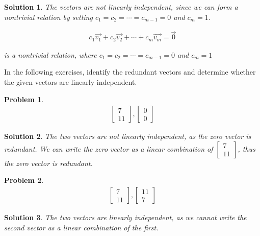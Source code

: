 \documentclass{article}
\newtheorem{problem}{Problem}
\newtheorem*{solution}{Solution}
\begin{document}
\begin{solution}
The vectors are not linearly independent, since we can form a nontrivial relation by setting $c_{1} = c_{2} = \cdots = c_{m-1} = 0$ and $c_{m} = 1$.

\begin{align*}
c_{1} \vec{v_{1}} + c_{2} \vec{v_{2}} + \cdots + c_{m} \vec{v_{m}} = \vec{0}
\end{align*}

is a nontrivial relation, where $c_{1} = c_{2} = \cdots = c_{m-1} = 0$ and $c_{m} = 1$
\end{solution}

In the following exercises, identify the redundant vectors and determine whether the given vectors are linearly independent.

\begin{problem}
\begin{align*}
\begin{bmatrix} 7 \\ 11 \end{bmatrix}, 
\begin{bmatrix} 0 \\ 0 \end{bmatrix}
\end{align*}
\end{problem}

\begin{solution}
The two vectors are not linearly independent, as the zero vector is redundant. We can write the zero vector as a linear combination of $\begin{bmatrix} 7 \\ 11 \end{bmatrix}$, thus the zero vector is redundant.
\end{solution}

\begin{problem}
\begin{align*}
\begin{bmatrix} 7 \\ 11 \end{bmatrix}, 
\begin{bmatrix} 11 \\ 7 \end{bmatrix}
\end{align*}
\end{problem}

\begin{solution}
The two vectors are linearly independent, as we cannot write the second vector as a linear combination of the first.
\end{solution}
\end{document}
